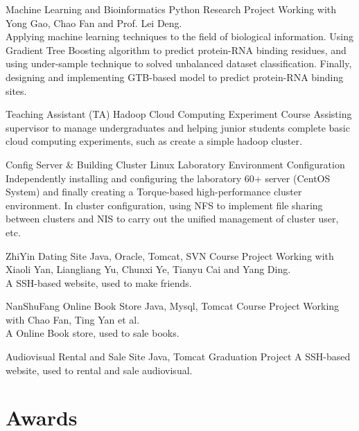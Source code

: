 \documentclass[11pt,a4paper]{moderncv}
\begin{document}
{Machine Learning and Bioinformatics}
{Python}
{Research Project}{}
{
Working with Yong Gao, Chao Fan and Prof. Lei Deng. \\
Applying machine learning techniques to the field of biological information. Using Gradient Tree Boosting algorithm to predict protein-RNA binding residues, and using under-sample technique to solved unbalanced dataset classification. Finally, designing and implementing GTB-based model to predict protein-RNA binding sites.}

\vspace*{0.2\baselineskip}
{Teaching Assistant (TA)}
{Hadoop}
{Cloud Computing Experiment Course}{}
{Assisting supervisor to manage undergraduates and helping junior students complete basic cloud computing experiments, such as create a simple hadoop cluster.
}


\vspace*{0.2\baselineskip}
{Config Server \& Building Cluster}
{Linux}{}
{Laboratory Environment Configuration}
{Independently installing and configuring the laboratory 60+ server (CentOS System) and finally creating a Torque-based high-performance cluster environment. In cluster configuration, using NFS to implement file sharing between clusters and NIS to carry out the unified management of cluster user, etc.
}



\vspace*{0.2\baselineskip}
{ZhiYin Dating Site}
{Java, Oracle, Tomcat, SVN}
{Course Project}{}
{Working with Xiaoli Yan, Liangliang Yu, Chunxi Ye, Tianyu Cai and Yang Ding. \\
A SSH-based website, used to make friends.
}



\vspace*{0.2\baselineskip}
{NanShuFang Online Book Store}
{Java, Mysql, Tomcat}
{Course Project}{}
{Working with Chao Fan, Ting Yan et al. \\
A Online Book store, used to sale books.}


\vspace*{0.2\baselineskip}
{Audiovisual Rental and Sale Site}
{Java, Tomcat}
{Graduation Project}{}
{
A SSH-based website, used to rental and sale audiovisual.
}


\section{Awards}
\end{document}
